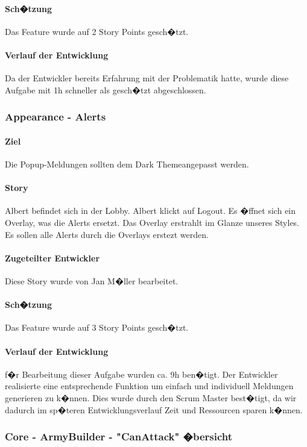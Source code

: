 \documentclass[12pt, titlepage]{scrartcl}
\begin{document}
			\paragraph{Sch�tzung}
			Das Feature wurde auf 2 Story Points gesch�tzt.
			\paragraph{Verlauf der Entwicklung} 
			Da der Entwickler bereits Erfahrung mit der Problematik hatte, wurde diese Aufgabe mit 1h schneller als gesch�tzt abgeschlossen.
			
			\subsubsection{Appearance - Alerts}
			\paragraph{Ziel} Die Popup-Meldungen sollten dem \glqq Dark Theme\grqq angepasst werden.
			\paragraph{Story} Albert befindet sich in der Lobby. Albert klickt auf Logout. Es �ffnet sich ein Overlay, was die Alerts ersetzt. Das Overlay erstrahlt im Glanze unseres Styles. Es sollen alle Alerts durch die Overlays erstezt werden.
			\paragraph{Zugeteilter Entwickler} Diese Story wurde von Jan M�ller bearbeitet. 
			\paragraph{Sch�tzung}
			Das Feature wurde auf 3 Story Points gesch�tzt.
			\paragraph{Verlauf der Entwicklung} 
			f�r Bearbeitung dieser Aufgabe wurden ca. 9h ben�tigt. Der Entwickler realisierte eine entsprechende Funktion um einfach und individuell Meldungen generieren zu k�nnen. Dies wurde durch den Scrum Master best�tigt, da wir dadurch im sp�teren Entwicklungsverlauf Zeit und Ressourcen sparen k�nnen.
			
			\subsubsection{Core - ArmyBuilder - "CanAttack" �bersicht}
\end{document}
